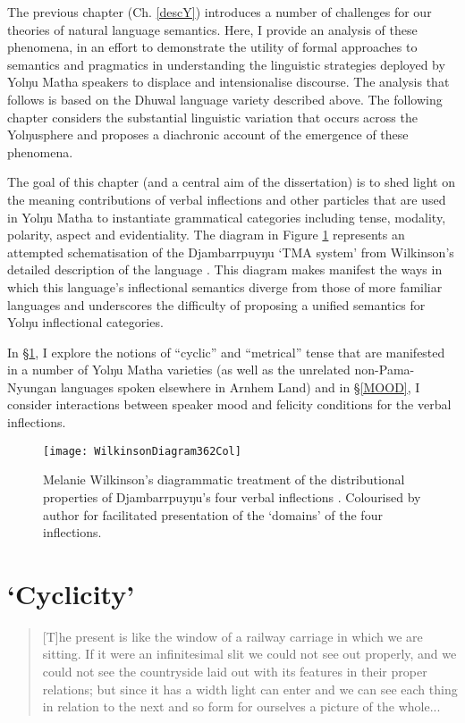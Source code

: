 

The previous chapter (Ch. \ref{descY}) introduces a number of challenges for our theories of natural language semantics. Here, I provide an analysis of these phenomena, in an effort to demonstrate the utility of formal approaches to semantics and pragmatics in understanding the linguistic strategies deployed by Yolŋu Matha speakers to displace and intensionalise discourse. The analysis that follows is based on the Dhuwal language variety described above. The following chapter considers the substantial linguistic variation that occurs across the Yolŋusphere and proposes a diachronic account of the emergence of these phenomena.

The goal of this chapter (and a central aim of the dissertation) is to shed light on the meaning contributions of verbal inflections and other particles that are used in Yolŋu Matha to instantiate grammatical categories including tense, modality, polarity, aspect and evidentiality. The diagram in Figure \ref{wilk} represents an attempted schematisation of the Djambarrpuyŋu `TMA system' from Wilkinson's detailed description of the language \citeyearpar[362]{Wilkinson1991}. This diagram makes manifest the ways in which this language's inflectional semantics diverge from those of more familiar languages and underscores the difficulty of proposing a unified semantics for Yolŋu inflectional categories.

In §\ref{cycTns}, I explore the notions of ``cyclic'' and ``metrical'' tense that are manifested in a number of Yolŋu Matha varieties (as well as the unrelated non-Pama-Nyungan languages spoken elsewhere in Arnhem Land) and in §\ref{MOOD}, I consider interactions between speaker mood and felicity conditions for the verbal inflections.


	





\begin{figure}[h]\centering
\texttt{[image: WilkinsonDiagram362Col]}
	\caption{Melanie Wilkinson's diagrammatic treatment of the distributional properties of Djambarrpuyŋu's four verbal inflections \citeyearpar[362]{Wilkinson1991}. Colourised by author for facilitated presentation of the `domains' of the four inflections.} \label{wilk}
\end{figure}

\section{`Cyclicity'}\label{cycTns}
\begin{quotation}
	[T]he present is like the window of a railway carriage in which we are sitting. If it were an infinitesimal slit we could not see out properly, and we could not see the countryside laid out with its features in their proper relations; but since it has a width light can enter and we can see each thing in relation to the next and so form for ourselves a picture of the whole...\hfill{\citealp[325]{Hamblin1972}}
\end{quotation}

